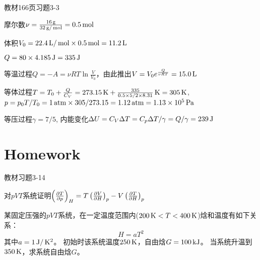 \documentclass[CJK]{beamer}
\begin{document}
\begin{frame}
  \bch
  教材166页习题3-3
  \ech
\end{frame}

\begin{frame}
  \bch
  摩尔数$\nu = \frac{16\,\mathrm{g}}{32\,\mathrm{g}/\,\mathrm{mol}} = 0.5\,\mathrm{mol}$
  
  体积$V_0 = 22.4\,\mathrm{L}/\,\mathrm{mol} \times 0.5\,\mathrm{mol} = 11.2\,\mathrm{L}$

  $Q = 80\times 4.185 \,\mathrm{J} = 335\,\mathrm{J}$
  \bitem
\item{等温过程$Q = -A = \nu RT \ln\frac{V}{V_0}$，由此推出$V = V_0e^{\frac{Q}{\nu RT}} = 15.0\,\mathrm{L}$}
\item{等体过程$T = T_0+ \frac{Q}{C_V} = 273.15\,\mathrm{K} + \frac{335}{0.5\times 5/2\times 8.31}\,\mathrm{K} = 305\,\mathrm{K}$, $p = p_0 T/T_0 = 1\,\mathrm{atm} \times 305/273.15 = 1.12 \,\mathrm{atm} = 1.13\times 10^5\,\mathrm{Pa}$}
\item{等压过程$\gamma = 7/5$, 内能变化$\Delta U = C_V\Delta T = C_p\Delta T /\gamma = Q/\gamma = 239\,\mathrm{J}$}
  \eitem
  
  \ech
\end{frame}

\section{Homework}

\begin{frame}
  \bch
  {\small 
  \bitem
\item{教材习题3-14}
\item{对$pVT$系统证明$\left(\frac{\partial T}{\partial p}\right)_{H} = T \left(\frac{\partial V}{\partial H}\right)_{p} - V\left(\frac{\partial T}{\partial H}\right)_{p}$}
\item{某固定压强的$pVT$系统，在一定温度范围内($200\,\mathrm{K} < T< 400 \,\mathrm{K}$)焓和温度有如下关系：
  $$H =  aT^2 $$
  其中$a=1 \,\mathrm{J}/\,\mathrm{K}^2$。
  初始时该系统温度$250\,\mathrm{K}$，自由焓$G = 100 \,\mathrm{kJ}$。
  当系统升温到$350\,\mathrm{K}$，求系统自由焓$G$。
}
  \eitem
  }
  \ech
\end{frame}
\end{document}
